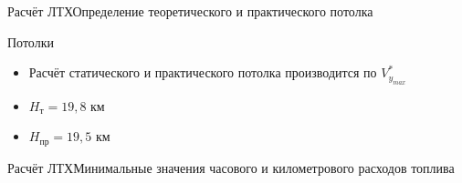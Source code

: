 \begin{frame}{Расчёт ЛТХ}{Определение теоретического и практического потолка}
    \begin{minipage}[c]{0.45\textwidth}
        \begin{block}{Потолки}
        \begin{itemize}
            \item  [] Расчёт статического и практического потолка производится по $V^*_{y_{max}}$
            \item  [] $H_\text{т} = 19,8$ км 
            \item  [] $H_\text{пр} = 19,5$ км
        \end{itemize}
        \end{block}
    \end{minipage}
    \begin{minipage}[c]{0.45\textwidth}
    \end{minipage}
\end{frame}

\begin{frame}{Расчёт ЛТХ}{Минимальные значения часового и километрового расходов топлива}
\end{frame}

